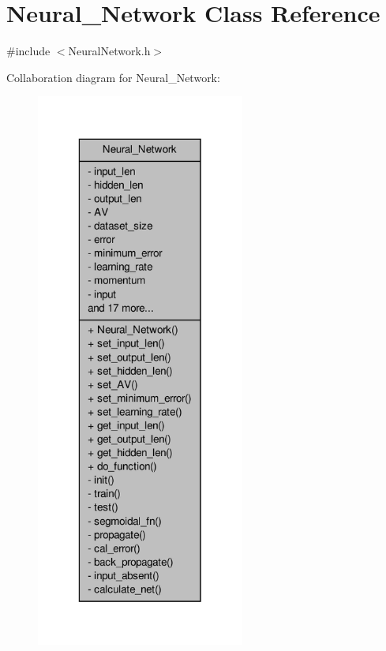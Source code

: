 \hypertarget{a00003}{\section{Neural\-\_\-\-Network Class Reference}
\label{d1/d7c/a00003}
}


{\ttfamily \#include $<$Neural\-Network.\-h$>$}



Collaboration diagram for Neural\-\_\-\-Network\-:\nopagebreak
\begin{figure}[H]
\begin{center}
\leavevmode
\includegraphics[width=194pt]{d3/dea/a00046}
\end{center}
\end{figure}
